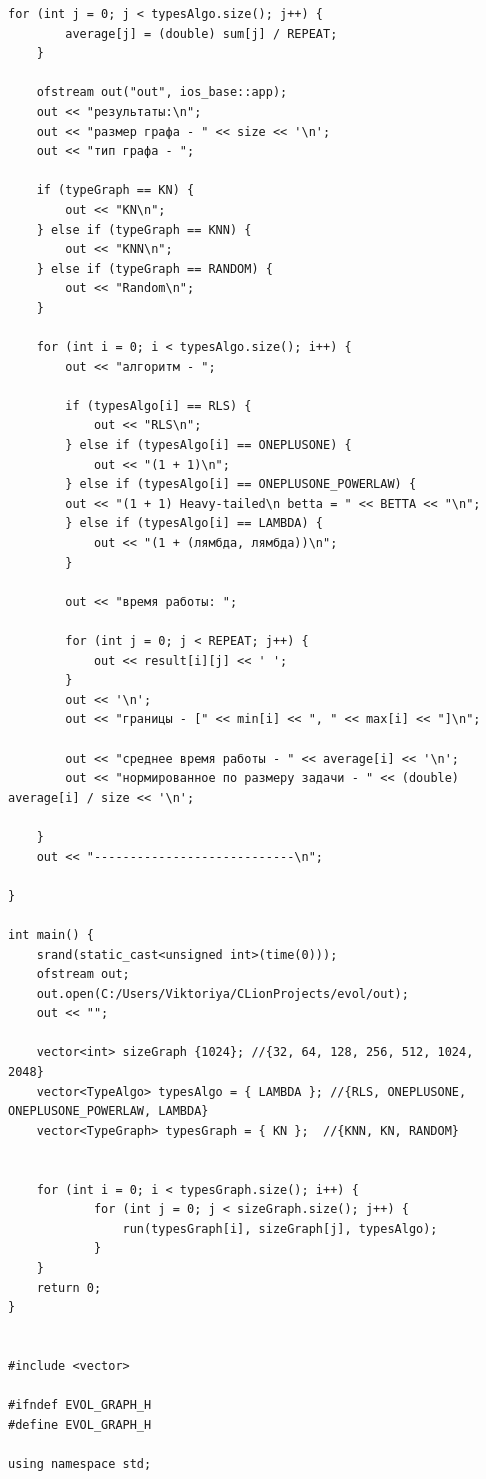 \documentclass[times]{itmo-student-thesis}
\newcommand{\ollga}{${(1 + (\lambda , \lambda))}$-ГА\xspace}
\begin{document}
\begin{lstlisting}[caption={Реализация \ollga со сбором статистики},label={ollgaStat}]
    for (int j = 0; j < typesAlgo.size(); j++) {
        average[j] = (double) sum[j] / REPEAT;
    }

    ofstream out("out", ios_base::app);
    out << "результаты:\n";
    out << "размер графа - " << size << '\n';
    out << "тип графа - ";

    if (typeGraph == KN) {
        out << "KN\n";
    } else if (typeGraph == KNN) {
        out << "KNN\n";
    } else if (typeGraph == RANDOM) {
        out << "Random\n";
    }

    for (int i = 0; i < typesAlgo.size(); i++) {
        out << "алгоритм - ";

        if (typesAlgo[i] == RLS) {
            out << "RLS\n";
        } else if (typesAlgo[i] == ONEPLUSONE) {
            out << "(1 + 1)\n";
        } else if (typesAlgo[i] == ONEPLUSONE_POWERLAW) {
        out << "(1 + 1) Heavy-tailed\n betta = " << BETTA << "\n";
        } else if (typesAlgo[i] == LAMBDA) {
            out << "(1 + (лямбда, лямбда))\n";
        }

        out << "время работы: ";

        for (int j = 0; j < REPEAT; j++) {
            out << result[i][j] << ' ';
        }
        out << '\n';
        out << "границы - [" << min[i] << ", " << max[i] << "]\n";

        out << "среднее время работы - " << average[i] << '\n';
        out << "нормированное по размеру задачи - " << (double) average[i] / size << '\n';

    }
    out << "----------------------------\n";

}

int main() {
    srand(static_cast<unsigned int>(time(0)));
    ofstream out;
    out.open(C:/Users/Viktoriya/CLionProjects/evol/out);
    out << "";

    vector<int> sizeGraph {1024}; //{32, 64, 128, 256, 512, 1024, 2048}
    vector<TypeAlgo> typesAlgo = { LAMBDA }; //{RLS, ONEPLUSONE, ONEPLUSONE_POWERLAW, LAMBDA}
    vector<TypeGraph> typesGraph = { KN };  //{KNN, KN, RANDOM}


    for (int i = 0; i < typesGraph.size(); i++) {
            for (int j = 0; j < sizeGraph.size(); j++) {
                run(typesGraph[i], sizeGraph[j], typesAlgo);
            }
    }
    return 0;
}


#include <vector>

#ifndef EVOL_GRAPH_H
#define EVOL_GRAPH_H

using namespace std;


\end{lstlisting}
\end{document}
